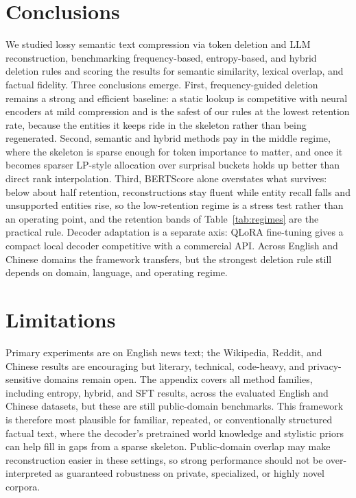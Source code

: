\documentclass[11pt]{article}
\begin{document}
\section{Conclusions}
\label{sec:conclusion}

We studied lossy semantic text compression via token deletion and LLM reconstruction, benchmarking frequency-based, entropy-based, and hybrid deletion rules and scoring the results for semantic similarity, lexical overlap, and factual fidelity. Three conclusions emerge. First, frequency-guided deletion remains a strong and efficient baseline: a static lookup is competitive with neural encoders at mild compression and is the safest of our rules at the lowest retention rate, because the entities it keeps ride in the skeleton rather than being regenerated. Second, semantic and hybrid methods pay in the middle regime, where the skeleton is sparse enough for token importance to matter, and once it becomes sparser LP-style allocation over surprisal buckets holds up better than direct rank interpolation. Third, BERTScore alone overstates what survives: below about half retention, reconstructions stay fluent while entity recall falls and unsupported entities rise, so the low-retention regime is a stress test rather than an operating point, and the retention bands of Table~\ref{tab:regimes} are the practical rule. Decoder adaptation is a separate axis: QLoRA fine-tuning gives a compact local decoder competitive with a commercial API. Across English and Chinese domains the framework transfers, but the strongest deletion rule still depends on domain, language, and operating regime.

\section{Limitations}
\label{sec:limitations}

Primary experiments are on English news text; the Wikipedia, Reddit, and Chinese results
are encouraging but literary, technical, code-heavy, and privacy-sensitive domains remain open.
The appendix covers all method families, including entropy, hybrid, and SFT results,
across the evaluated English and Chinese datasets, but these are still public-domain benchmarks.
This framework is therefore most plausible for familiar, repeated, or conventionally structured
factual text, where the decoder's pretrained world knowledge and stylistic priors can help fill
in gaps from a sparse skeleton. Public-domain overlap may make reconstruction easier in these
settings, so strong performance should not be over-interpreted as guaranteed robustness on private,
specialized, or highly novel corpora.
\end{document}

